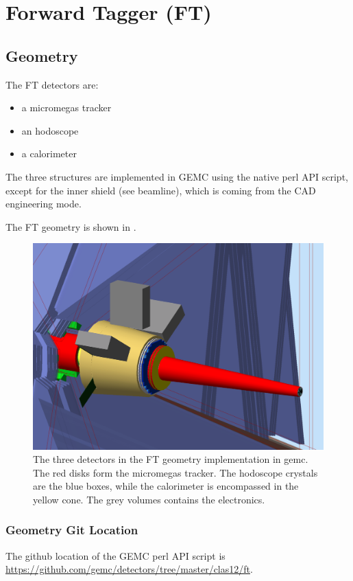 \section{Forward Tagger (FT)}


\subsection{Geometry}

The FT detectors are:

\begin{itemize}
	\item a micromegas tracker
	\item an hodoscope
 	\item a calorimeter
\end{itemize}

The three structures are implemented in GEMC using the native perl API script, except for the inner shield (see beamline), which is coming from the CAD engineering mode.

The FT geometry is shown in .


\begin{figure}
	\centering
	\includegraphics[width=0.95\columnwidth,keepaspectratio]{img/ftGeometry.png}
	\caption{The three detectors in the FT geometry implementation in gemc. The red disks form the micromegas tracker. The hodoscope crystals are the blue boxes,
            while the calorimeter is encompassed in the yellow cone. The grey volumes contains the electronics.}
	\label{fig:ftGeometry}
\end{figure}




\subsubsection{Geometry Git Location}
The github location of the GEMC perl API script is \url{https://github.com/gemc/detectors/tree/master/clas12/ft}.


